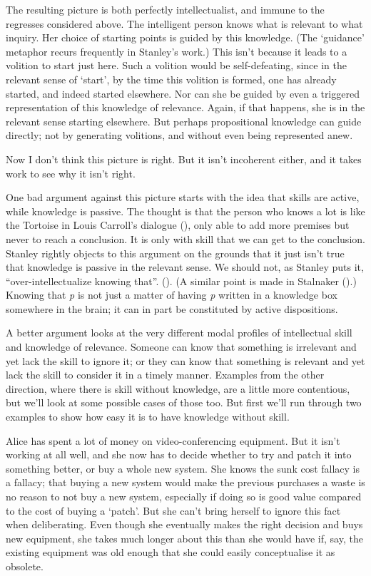 \documentclass[
  11pt,
  letterpaper,
  DIV=11,
  numbers=noendperiod,
  twoside]{scrartcl}
\begin{document}
The resulting picture is both perfectly intellectualist, and immune to
the regresses considered above. The intelligent person knows what is
relevant to what inquiry. Her choice of starting points is guided by
this knowledge. (The `guidance' metaphor recurs frequently in Stanley's
work.) This isn't because it leads to a volition to start just here.
Such a volition would be self-defeating, since in the relevant sense of
`start', by the time this volition is formed, one has already started,
and indeed started elsewhere. Nor can she be guided by even a triggered
representation of this knowledge of relevance. Again, if that happens,
she is in the relevant sense starting elsewhere. But perhaps
propositional knowledge can guide directly; not by generating volitions,
and without even being represented anew.

Now I don't think this picture is right. But it isn't incoherent either,
and it takes work to see why it isn't right.

One bad argument against this picture starts with the idea that skills
are active, while knowledge is passive. The thought is that the person
who knows a lot is like the Tortoise in Louis Carroll's dialogue
(), only able to add more
premises but never to reach a conclusion. It is only with skill that we
can get to the conclusion. Stanley rightly objects to this argument on
the grounds that it just isn't true that knowledge is passive in the
relevant sense. We should not, as Stanley puts it,
``over-intellectualize knowing that''.
(). (A similar
point is made in Stalnaker ().)
Knowing that \emph{p} is not just a matter of having \emph{p} written in
a knowledge box somewhere in the brain; it can in part be constituted by
active dispositions.

A better argument looks at the very different modal profiles of
intellectual skill and knowledge of relevance. Someone can know that
something is irrelevant and yet lack the skill to ignore it; or they can
know that something is relevant and yet lack the skill to consider it in
a timely manner. Examples from the other direction, where there is skill
without knowledge, are a little more contentious, but we'll look at some
possible cases of those too. But first we'll run through two examples to
show how easy it is to have knowledge without skill.

Alice has spent a lot of money on video-conferencing equipment. But it
isn't working at all well, and she now has to decide whether to try and
patch it into something better, or buy a whole new system. She knows the
sunk cost fallacy is a fallacy; that buying a new system would make the
previous purchases a waste is no reason to not buy a new system,
especially if doing so is good value compared to the cost of buying a
`patch'. But she can't bring herself to ignore this fact when
deliberating. Even though she eventually makes the right decision and
buys new equipment, she takes much longer about this than she would have
if, say, the existing equipment was old enough that she could easily
conceptualise it as obsolete.
\end{document}
